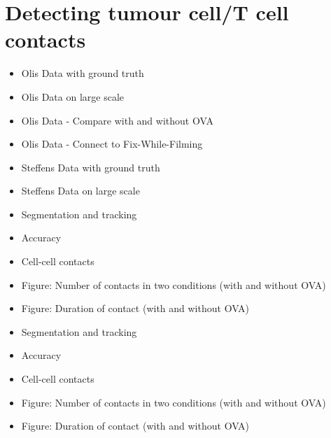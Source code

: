 \documentclass{report}
\begin{document}
\section{Detecting tumour cell/T cell contacts}

\begin{itemize}
	\item Olis Data with ground truth
	\item Olis Data on large scale
	\item Olis Data - Compare with and without OVA
	\item Olis Data - Connect to Fix-While-Filming
	\item Steffens Data with ground truth
	\item Steffens Data on large scale
\end{itemize}

\begin{itemize}
 \item Segmentation and tracking
 \item Accuracy
 \item Cell-cell contacts
 \item Figure: Number of contacts in two conditions (with and without OVA)
 \item Figure: Duration of contact (with and without OVA)
 \item Segmentation and tracking
 \item Accuracy
 \item Cell-cell contacts
 \item Figure: Number of contacts in two conditions (with and without OVA)
 \item Figure: Duration of contact (with and without OVA)
\end{itemize}




%

\renewcommand{\bibname}{References}



%
% 
\end{document}
